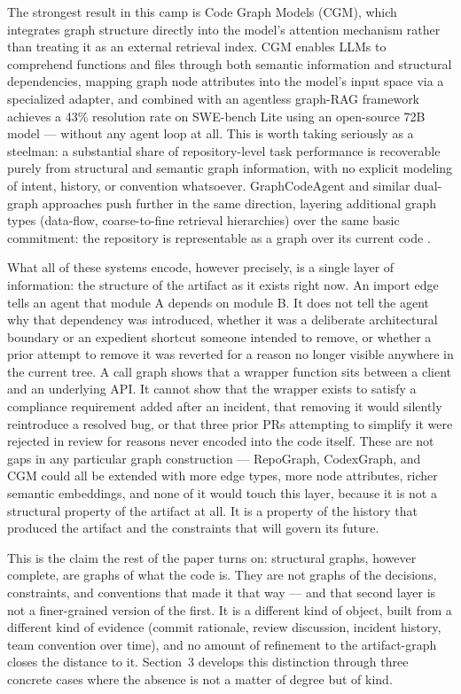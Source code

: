 \documentclass[11pt]{article}
\begin{document}
The strongest result in this camp is Code Graph Models (CGM), which integrates graph structure directly into the model's attention mechanism rather than treating it as an external retrieval index. CGM enables LLMs to comprehend functions and files through both semantic information and structural dependencies, mapping graph node attributes into the model's input space via a specialized adapter, and combined with an agentless graph-RAG framework achieves a 43\% resolution rate on SWE-bench Lite using an open-source 72B model \citep{cgm2025} --- without any agent loop at all. This is worth taking seriously as a steelman: a substantial share of repository-level task performance is recoverable purely from structural and semantic graph information, with no explicit modeling of intent, history, or convention whatsoever. GraphCodeAgent and similar dual-graph approaches push further in the same direction, layering additional graph types (data-flow, coarse-to-fine retrieval hierarchies) over the same basic commitment: the repository is representable as a graph over its current code \citep{li2025graphcodeagent}.

What all of these systems encode, however precisely, is a single layer of information: the structure of the artifact as it exists right now. An import edge tells an agent that module A depends on module B. It does not tell the agent why that dependency was introduced, whether it was a deliberate architectural boundary or an expedient shortcut someone intended to remove, or whether a prior attempt to remove it was reverted for a reason no longer visible anywhere in the current tree. A call graph shows that a wrapper function sits between a client and an underlying API. It cannot show that the wrapper exists to satisfy a compliance requirement added after an incident, that removing it would silently reintroduce a resolved bug, or that three prior PRs attempting to simplify it were rejected in review for reasons never encoded into the code itself. These are not gaps in any particular graph construction --- RepoGraph, CodexGraph, and CGM could all be extended with more edge types, more node attributes, richer semantic embeddings, and none of it would touch this layer, because it is not a structural property of the artifact at all. It is a property of the history that produced the artifact and the constraints that will govern its future.

This is the claim the rest of the paper turns on: structural graphs, however complete, are graphs of what the code is. They are not graphs of the decisions, constraints, and conventions that made it that way --- and that second layer is not a finer-grained version of the first. It is a different kind of object, built from a different kind of evidence (commit rationale, review discussion, incident history, team convention over time), and no amount of refinement to the artifact-graph closes the distance to it. Section~3 develops this distinction through three concrete cases where the absence is not a matter of degree but of kind.
\end{document}
